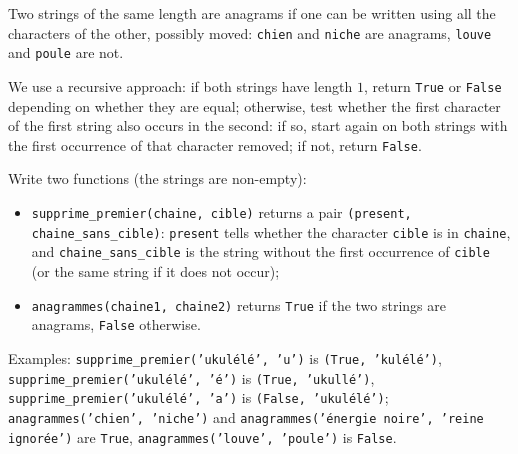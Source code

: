 Two strings of the same length are anagrams if one can be written using all the characters of the other, possibly moved: \texttt{chien} and \texttt{niche} are anagrams, \texttt{louve} and \texttt{poule} are not.

We use a recursive approach: if both strings have length $1$, return \texttt{True} or \texttt{False} depending on whether they are equal; otherwise, test whether the first character of the first string also occurs in the second: if so, start again on both strings with the first occurrence of that character removed; if not, return \texttt{False}.

Write two functions (the strings are non-empty):
\begin{itemize}
\item \texttt{supprime\_premier(chaine, cible)} returns a pair \texttt{(present, chaine\_sans\_cible)}: \texttt{present} tells whether the character \texttt{cible} is in \texttt{chaine}, and \texttt{chaine\_sans\_cible} is the string without the first occurrence of \texttt{cible} (or the same string if it does not occur);
\item \texttt{anagrammes(chaine1, chaine2)} returns \texttt{True} if the two strings are anagrams, \texttt{False} otherwise.
\end{itemize}
Examples: \texttt{supprime\_premier('ukulélé', 'u')} is \texttt{(True, 'kulélé')}, \texttt{supprime\_premier('ukulélé', 'é')} is \texttt{(True, 'ukullé')}, \texttt{supprime\_premier('ukulélé', 'a')} is \texttt{(False, 'ukulélé')}; \texttt{anagrammes('chien', 'niche')} and \texttt{anagrammes('énergie noire', 'reine ignorée')} are \texttt{True}, \texttt{anagrammes('louve', 'poule')} is \texttt{False}.
